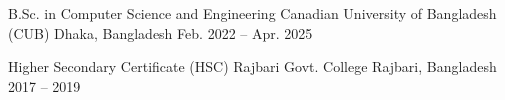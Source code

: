 

\begin{cventries}

\cventry
  {B.Sc. in Computer Science and Engineering} %
  {Canadian University of Bangladesh (CUB)} %
  {Dhaka, Bangladesh} %
  {Feb. 2022 -- Apr. 2025} %
  {} %

\cventry
  {Higher Secondary Certificate (HSC)} %
  {Rajbari Govt. College} %
  {Rajbari, Bangladesh} %
  {2017 -- 2019} %
  {} %


\end{cventries}
